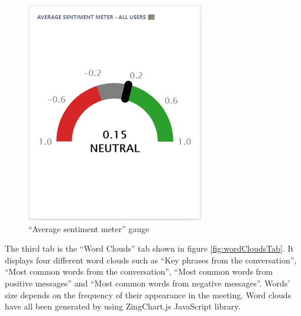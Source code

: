 \documentclass{article}
\begin{document}
\begin{figure}[H]
\begin{minipage}{.5\textwidth}
  \includegraphics[width=1\linewidth]{charts/gauge.png}
  \caption{``Average sentiment meter'' gauge}
  \label{fig:gauge}
\end{minipage}
\end{figure}

{\large 
The third tab is the ``Word Clouds'' tab shown in figure \ref{fig:wordCloudsTab}. It displays four different word clouds such as ``Key phrases from the conversation'', ``Most common words from the conversation'', ``Most common words from positive messages'' and ``Most common words from negative messages''. Words' size depends on the frequency of their appearance in the meeting. Word clouds have all been generated by using ZingChart.js JavaScript library.\par
}
\end{document}
